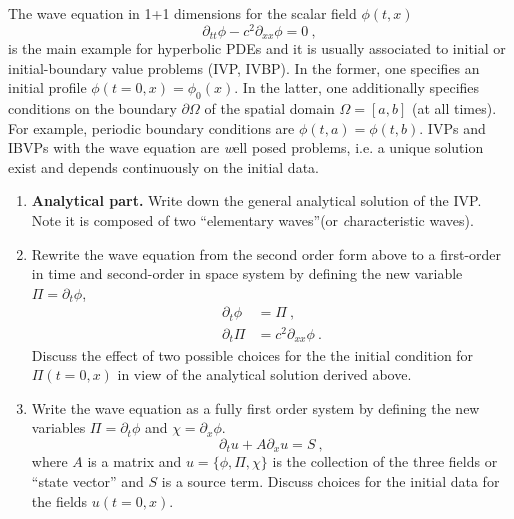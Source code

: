 \documentclass[11pt,a4paper,headinclude=true,DIV=14,BCOR=8mm,chapterprefix,listof=totoc,twoside,openright,abstracton]{scrbook}
\begin{document}
  The wave equation in 1+1 dimensions for the scalar field $\phi(t,x)$
  \begin{equation}\label{eq:waveq:2}
    \partial_{tt} \phi - c^2 \partial_{xx} \phi = 0  \ ,
  \end{equation}
  is the main example for hyperbolic PDEs and it is usually associated to initial or initial-boundary value problems
  (IVP, IVBP). In the former, one specifies an initial profile
  $\phi(t=0,x)=\phi_0(x)$. In the latter, one additionally specifies conditions
  on the boundary $\partial\Omega$ of the spatial domain
  $\Omega=[a,b]$ (at all times). For example, periodic boundary
  conditions are $\phi(t,a)=\phi(t,b)$. IVPs and IBVPs with the wave
  equation are {\textit well posed} problems, i.e. a unique solution exist
  and depends continuously on the initial data.
  \begin{enumerate}
  \item \textbf{Analytical part.} Write down the general analytical solution of the IVP. Note it
    is composed of two ``elementary waves''(or {\textit characteristic waves}).
  \item Rewrite the wave equation from the second order form above to a
    first-order in time and second-order in space system by defining
    the new variable $\Pi = \partial_t \phi$, 
    \begin{subequations}
      \label{eq:waveq:1t2x}
      \begin{align}
        \partial_{t} \phi &= \Pi  \ ,\\
        \partial_{t} \Pi &= c^2 \partial_{xx} \phi  \ .
      \end{align}
    \end{subequations}
    Discuss the effect of two possible choices for the the initial
    condition for $\Pi(t=0,x)$ in view of the analytical solution derived above.
  \item Write the wave equation as a fully first order system by defining
    the new variables $\Pi = \partial_t \phi$ and $\chi = \partial_x
    \phi$.  
    \begin{equation}\label{eq:waveq:1}
    \partial_{t} u + A \partial_{x} u = S  \ ,
    \end{equation}
    where $A$ is a matrix and $u=\{\phi,\Pi,\chi\}$ is the collection
    of the three fields or ``state vector'' and $S$ is a source term.
    Discuss choices for the initial data for the fields $u(t=0,x)$.


\end{enumerate}
\end{document}
